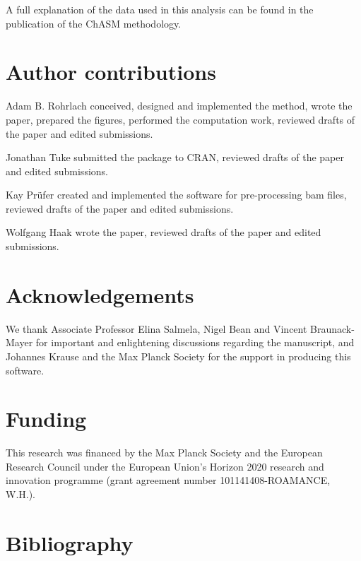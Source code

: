 \documentclass[10pt,a4paper]{article}
\begin{document}
A full explanation of the data used in this analysis can be found in the publication of the ChASM methodology\cite{rohrlach2026chasm}.

\section{Author contributions}

Adam B. Rohrlach conceived, designed and implemented the method, wrote the paper, prepared the figures, performed the computation work, reviewed drafts of the paper and edited submissions.

Jonathan Tuke submitted the package to CRAN, reviewed drafts of the paper and edited submissions.

Kay Prüfer created and implemented the software for pre-processing bam files, reviewed drafts of the paper and edited submissions.

Wolfgang Haak wrote the paper, reviewed drafts of the paper and edited submissions.

\section{Acknowledgements}

We thank Associate Professor Elina Salmela, Nigel Bean and Vincent Braunack-Mayer for important and enlightening discussions regarding the manuscript, and Johannes Krause and the Max Planck Society for the support in producing this software.

\section{Funding}
This research was financed by the Max Planck Society and the European Research Council under the European Union’s Horizon 2020 research and innovation programme (grant agreement number 101141408-ROAMANCE, W.H.).

\section{Bibliography}


\end{document}
